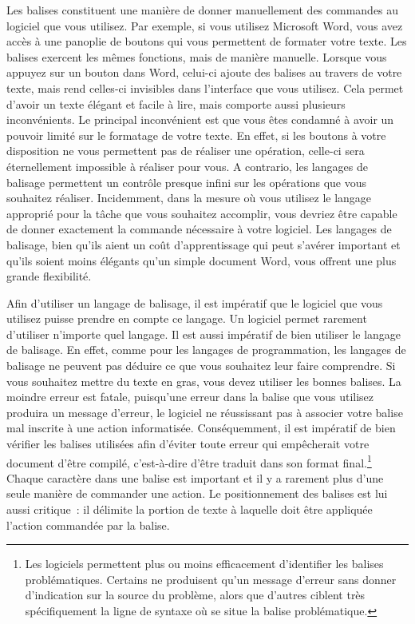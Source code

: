 \documentclass[
  letterpaper,
]{scrbook}
\begin{document}
Les balises constituent une manière de donner manuellement des commandes
au logiciel que vous utilisez. Par exemple, si vous utilisez Microsoft
Word, vous avez accès à une panoplie de boutons qui vous permettent de
formater votre texte. Les balises exercent les mêmes fonctions, mais de
manière manuelle. Lorsque vous appuyez sur un bouton dans Word, celui-ci
ajoute des balises au travers de votre texte, mais rend celles-ci
invisibles dans l'interface que vous utilisez. Cela permet d'avoir un
texte élégant et facile à lire, mais comporte aussi plusieurs
inconvénients. Le principal inconvénient est que vous êtes condamné à
avoir un pouvoir limité sur le formatage de votre texte. En effet, si
les boutons à votre disposition ne vous permettent pas de réaliser une
opération, celle-ci sera éternellement impossible à réaliser pour vous.
A contrario, les langages de balisage permettent un contrôle presque
infini sur les opérations que vous souhaitez réaliser. Incidemment, dans
la mesure où vous utilisez le langage approprié pour la tâche que vous
souhaitez accomplir, vous devriez être capable de donner exactement la
commande nécessaire à votre logiciel. Les langages de balisage, bien
qu'ils aient un coût d'apprentissage qui peut s'avérer important et
qu'ils soient moins élégants qu'un simple document Word, vous offrent
une plus grande flexibilité.

Afin d'utiliser un langage de balisage, il est impératif que le logiciel
que vous utilisez puisse prendre en compte ce langage. Un logiciel
permet rarement d'utiliser n'importe quel langage. Il est aussi
impératif de bien utiliser le langage de balisage. En effet, comme pour
les langages de programmation, les langages de balisage ne peuvent pas
déduire ce que vous souhaitez leur faire comprendre. Si vous souhaitez
mettre du texte en gras, vous devez utiliser les bonnes balises. La
moindre erreur est fatale, puisqu'une erreur dans la balise que vous
utilisez produira un message d'erreur, le logiciel ne réussissant pas à
associer votre balise mal inscrite à une action informatisée.
Conséquemment, il est impératif de bien vérifier les balises utilisées
afin d'éviter toute erreur qui empêcherait votre document d'être
compilé, c'est-à-dire d'être traduit dans son format final.\footnote{Les
  logiciels permettent plus ou moins efficacement d'identifier les
  balises problématiques. Certains ne produisent qu'un message d'erreur
  sans donner d'indication sur la source du problème, alors que d'autres
  ciblent très spécifiquement la ligne de syntaxe où se situe la balise
  problématique.} Chaque caractère dans une balise est important et il y
a rarement plus d'une seule manière de commander une action. Le
positionnement des balises est lui aussi critique~: il délimite la
portion de texte à laquelle doit être appliquée l'action commandée par
la balise.
\end{document}
